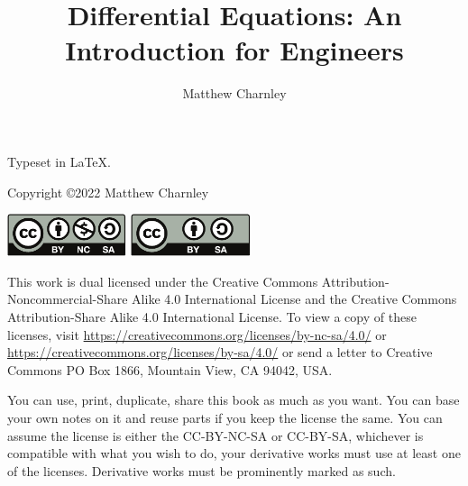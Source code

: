 \documentclass[12pt]{book}
\author{Matthew Charnley}
\title{Differential Equations: An Introduction for Engineers}
\begin{document}
\newcommand{\theversion}{0.9}
\myTitlePage

\newpage

\vspace*{\fill}

\begin{small}
\noindent
Typeset in \LaTeX.

\bigskip

\noindent
Copyright \copyright 2022 Matthew Charnley



\bigskip

\noindent
\includegraphics[width=1.38in]{figures/license}
\quad
\includegraphics[width=1.38in]{figures/license2}

\bigskip

\noindent
This work
is dual licensed under
the Creative Commons
Attribution-Non\-commercial-Share Alike 4.0 International License and
the Creative Commons
Attribution-Share Alike 4.0 International License.
To view a
copy of these licenses, visit
\url{https://creativecommons.org/licenses/by-nc-sa/4.0/}
or
\url{https://creativecommons.org/licenses/by-sa/4.0/}
or send a letter to
Creative Commons
PO Box 1866, Mountain View, CA 94042, USA\@.

\bigskip

\noindent
You can use, print, duplicate, share this book as much as you want.  You can
base your own notes on it and reuse parts if you keep the license the
same.  You can assume the license is either the
CC-BY-NC-SA or CC-BY-SA\@,
whichever is compatible with what you wish to do, your derivative works must
use at least one of the licenses.
Derivative works must be prominently marked as such.


\end{small}
\end{document}
